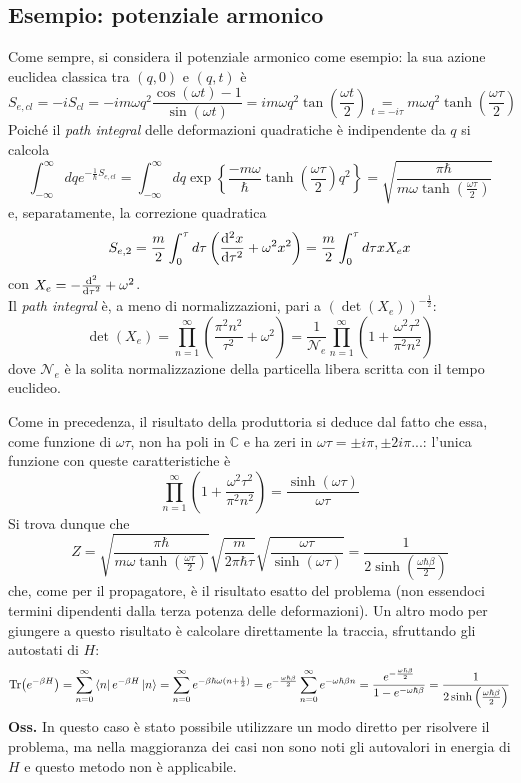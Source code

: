 \subsection{Esempio: potenziale armonico}
Come sempre, si considera il potenziale armonico come esempio: la sua azione euclidea classica tra
$(q,0)$ e $(q,t)$
è
$$S_{e,cl} = -iS_{cl} = -im\omega q^2\frac{\cos(\omega t)-1}{\sin(\omega t)}
=im\omega q^2\tan\left(\frac{\omega t}{2}\right)\underset{t=-i\tau}
=m\omega q^2\tanh\left(\frac{\omega\tau}{2}\right)$$
Poiché il \textit{path integral} delle deformazioni quadratiche è indipendente da $q$ si calcola
$$\int_{-\infty}^{\infty}dq e^{-\frac{1}{\hbar}S_{e,cl}}
=\int_{-\infty}^{\infty}dq \exp\left\{\frac{-m\omega}{\hbar}\tanh\left(\frac{\omega\tau}{2}\right)
q^2\right\} = \sqrt{\frac{\pi\hbar}{m\omega\tanh\left(\frac{\omega\tau}{2}\right)}}$$
e, separatamente, la correzione quadratica
$$S_{e,2} = \frac{m}{2}\int_{0}^{\tau}d\tau\left(\dv[2]{x}{\tau}+\omega^2x^2\right) = 
\frac{m}{2}\int_{0}^{\tau}d\tau xX_ex$$
con $X_e = -\dv[2]{}{\tau}+\omega^2$.\\
Il \textit{path integral} è, a meno di normalizzazioni, pari a $(\det(X_e))^{-\frac{1}{2}}$:
$$\det(X_e) = \prod_{n=1}^{\infty}\left(\frac{\pi^2n^2}{\tau^2}+\omega^2\right) = 
\frac{1}{\mathcal{N}_e}\prod_{n=1}^{\infty}\left(1+\frac{\omega^2\tau^2}{\pi^2n^2}\right)$$
dove $\mathcal{N}_e$ è la solita normalizzazione della particella libera scritta con il tempo euclideo.

Come in precedenza, il risultato della produttoria si deduce dal fatto che essa, come funzione di
$\omega \tau$, non ha poli in $\mathbb{C}$ e ha zeri in $\omega\tau = \pm i\pi,\pm 2i\pi...$: l'unica
funzione con queste caratteristiche è
$$\prod_{n=1}^{\infty}\left(1+\frac{\omega^2\tau^2}{\pi^2n^2}\right) =
\frac{\sinh(\omega\tau)}{\omega\tau}$$
Si trova dunque che
$$Z = \sqrt{\frac{\pi\hbar}{m\omega\tanh\left(\frac{\omega\tau}{2}\right)}}
\sqrt{\frac{m}{2\pi\hbar\tau}}\sqrt{\frac{\omega\tau}{\sinh(\omega\tau)}} =
\frac{1}{2\sinh\left(\frac{\omega\hbar\beta}{2}\right)}$$
che, come per il propagatore, è il risultato esatto del problema (non essendoci termini dipendenti dalla
terza potenza delle deformazioni). Un altro modo per giungere a questo risultato è calcolare direttamente
la traccia, sfruttando gli autostati di $H$:
$$\Tr(e^{-\beta H}) = \sum_{n=0}^{\infty}\bra{n}e^{-\beta H}\ket{n} =
\sum_{n=0}^{\infty}e^{-\beta\hbar\omega(n+\frac{1}{2})} =
e^{-\frac{\omega\hbar\beta}{2}}\sum_{n=0}^{\infty} e^{-\omega\hbar\beta n} =
\frac{e^{-\frac{\omega\hbar\beta}{2}}}{1-e^{-\omega\hbar\beta}} =
\frac{1}{2\sinh\left(\frac{\omega\hbar\beta}{2}\right)}$$
\textbf{Oss.} In questo caso è stato possibile utilizzare un modo diretto per risolvere il
problema, ma nella maggioranza dei casi non sono noti gli autovalori in energia di $H$ e questo metodo
non è applicabile.
\newpage
